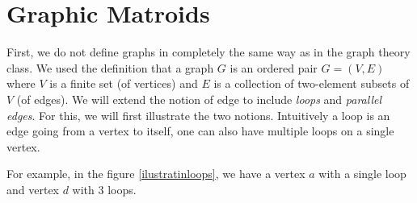\section{Graphic Matroids}


First, we do not define graphs in completely the same way as in the graph theory class. We used the definition that a graph $G$ is an ordered pair $G = (V, E)$ where $V$ is a finite set (of vertices) and $E$ is a collection of two-element subsets of $V$ (of edges). We will extend the notion of edge to include \textit{loops} and \textit{parallel edges}. For this, we will first illustrate the two notions. Intuitively a loop is an edge going from a vertex to itself, one can also have multiple loops on a single vertex.


For example, in the figure \ref{ilustratinloops}, we have a vertex $a$ with a single loop and vertex $d$ with 3 loops.

